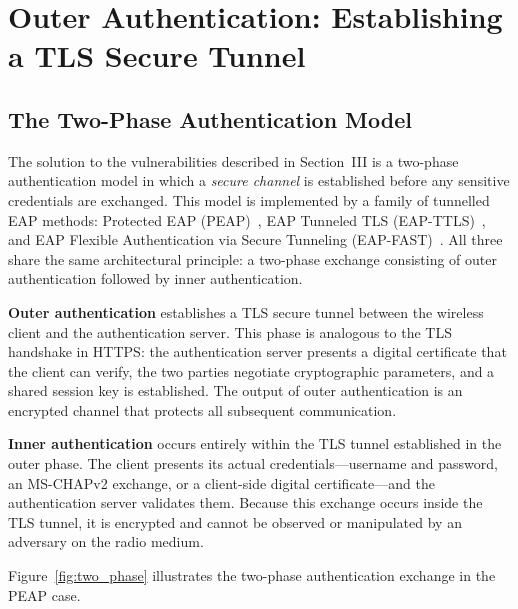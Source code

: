 \documentclass[journal]{IEEEtran}
\begin{document}
\section{Outer Authentication: Establishing a TLS Secure Tunnel}

\subsection{The Two-Phase Authentication Model}

The solution to the vulnerabilities described in Section~III is a two-phase
authentication model in which a \emph{secure channel} is established before any
sensitive credentials are exchanged. This model is implemented by a family of
tunnelled EAP methods: Protected EAP (PEAP)~\cite{peap}, EAP Tunneled TLS
(EAP-TTLS)~\cite{rfc5281}, and EAP Flexible Authentication via Secure Tunneling
(EAP-FAST)~\cite{rfc4851}. All three share the same architectural principle: a
two-phase exchange consisting of outer authentication followed by inner
authentication.

\textbf{Outer authentication} establishes a TLS secure tunnel between the wireless
client and the authentication server. This phase is analogous to the TLS handshake
in HTTPS: the authentication server presents a digital certificate that the client
can verify, the two parties negotiate cryptographic parameters, and a shared session
key is established. The output of outer authentication is an encrypted channel that
protects all subsequent communication.

\textbf{Inner authentication} occurs entirely within the TLS tunnel established in
the outer phase. The client presents its actual credentials---username and password,
an MS-CHAPv2 exchange, or a client-side digital certificate---and the authentication
server validates them. Because this exchange occurs inside the TLS tunnel, it is
encrypted and cannot be observed or manipulated by an adversary on the radio medium.

Figure~\ref{fig:two_phase} illustrates the two-phase authentication exchange in
the PEAP case.
\end{document}
